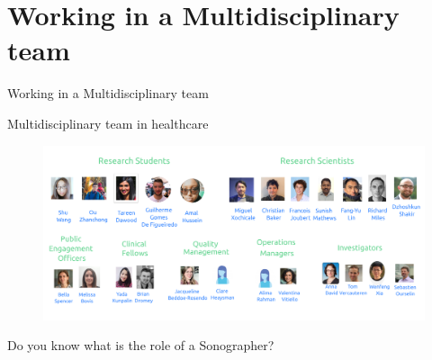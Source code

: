 \section{Working in a Multidisciplinary team}


{
\begin{frame}{}

\BigSizeFont
\begin{center}
    Working in a Multidisciplinary team
\end{center}

\end{frame}
}


{
\begin{frame}{Multidisciplinary team in healthcare}

  \begin{figure}
  \centering
  \includegraphics[width=1.0\textwidth]{./../figures/team/all/versions/drawing-v05.png}
  \end{figure}

\end{frame}
}


{
\begin{frame}{}

\BigSizeFont
\begin{center}
    Do you know what is the role of a Sonographer?
\end{center}

\end{frame}
}


